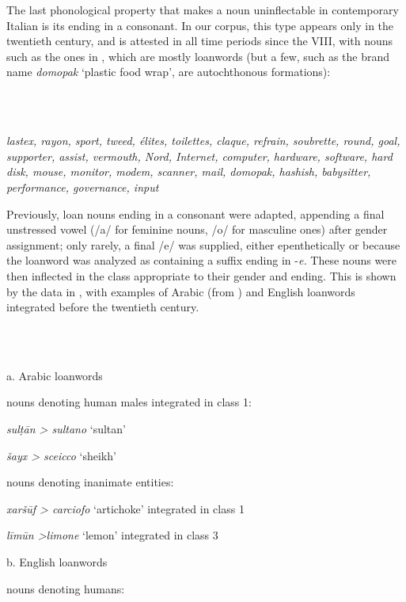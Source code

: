 \documentclass[output=paper]{langscibook}
\begin{document}
The last phonological property that makes a noun uninflectable in contemporary Italian is its ending in a consonant. In our corpus, this type appears only in the twentieth century, and is attested in all time periods since the VIII, with nouns such as the ones in , which are mostly loanwords (but a few, such as the brand name \textit{domopak} ‘plastic food wrap’, are autochthonous formations): 

\ea%
    \label{ex:key:7}
    \gll \\
         \\
    \glt
    \z %

          \textit{lastex, rayon, sport, tweed, élites, toilettes, claque, refrain, soubrette, round, goal, supporter, assist, vermouth, Nord, Internet, computer, hardware, software, hard disk, mouse, monitor, modem, scanner, mail, domopak, hashish, babysitter, performance, governance, input}

Previously, loan nouns ending in a consonant were adapted, appending a final unstressed vowel (/a/ for feminine nouns, /o/ for masculine ones) after gender assignment; only rarely, a final /e/ was supplied, either epenthetically or because the loanword was analyzed as containing a suffix ending in \nobreakdash-\textit{e.} These nouns were then inflected in the class appropriate to their gender and ending. This is shown by the data in , with examples of Arabic (from \citealt{Mancini1992}) and English loanwords integrated before the twentieth century.

\ea%
    \label{ex:key:8}
    \gll \\
         \\
    \glt
    \z %

          a.  Arabic loanwords

nouns denoting human males integrated in class 1:

\textit{sulṭān > sultano} ‘sultan’

\textit{šayx > sceicco} ‘sheikh’

nouns denoting inanimate entities:   

\textit{xaršūf > carciofo} ‘artichoke’ integrated in class 1

\textit{līmūn >limone} ‘lemon’ integrated in class 3

b.  English loanwords

nouns denoting humans:  
\end{document}
